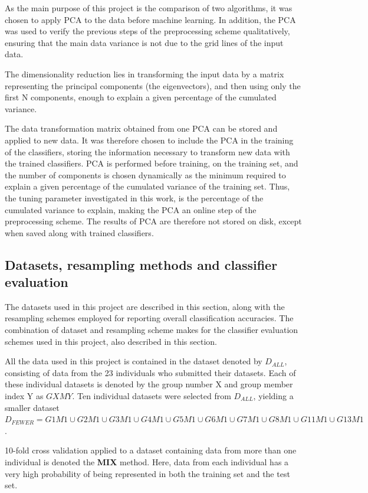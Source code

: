 As the main purpose of this project is the comparison of two algorithms,
it was chosen to apply PCA to the data before machine learning.
In addition, the PCA was used to verify the previous
steps of the preprocessing scheme qualitatively,
ensuring that the main data variance is not due to the grid lines of the input data.

The dimensionality reduction lies in transforming the input
data by a matrix representing the principal components
(the eigenvectors), and then using only the
first N components, enough to explain a given percentage of the cumulated variance.

The data transformation matrix obtained from one PCA
can be stored and applied to new data.
It was therefore chosen to include the PCA in the training of the classifiers,
storing the information necessary to transform new data
with the trained classifiers.
PCA is performed before training, on the training set,
and the number of components is chosen dynamically as the minimum
required to explain a given percentage of the cumulated variance
of the training set.
Thus, the tuning parameter investigated in this work,
is the percentage of the cumulated variance to explain,
making the PCA an online step of the preprocessing scheme.
The results of PCA are therefore not stored on disk,
except when saved along with trained classifiers.

\subsection{Datasets, resampling methods and classifier evaluation}
The datasets used in this project are described in this section,
along with the resampling schemes employed for reporting
overall classification accuracies.
The combination of dataset and resampling scheme makes
for the classifier evaluation schemes used in this project,
also described in this section.

All the data used in this project is contained in the dataset
denoted by \(D_{ALL}\), consisting of data from the 23
individuals who submitted their datasets.
Each of these individual datasets is denoted by the group number X
and group member index Y as \(GXMY\).
Ten individual datasets were selected from \(D_{ALL}\),
yielding a smaller dataset
\(D_{FEWER}=G1M1\cup G2M1\cup G3M1\cup G4M1\cup G5M1\cup G6M1\cup G7M1\cup G8M1\cup G11M1\cup G13M1\).

10-fold cross validation applied to a dataset containing data from more than
one individual is denoted the \textbf{MIX} method.
Here, data from each individual has a very high probability of
being represented in both the training set and the test set.

